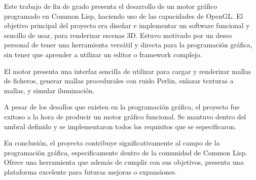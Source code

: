 Este trabajo de fin de grado presenta el desarrollo de un motor gráfico programado en Common Lisp,
haciendo uso de las capacidades de OpenGL.
El objetivo principal del proyecto era diseñar e implementar un software funcional y sencillo de usar,
para renderizar escenas 3D.
Estuvo motivado por un deseo personal de tener una herramienta versátil y directa para la programación gráfica,
sin tener que aprender a utilizar un editor o framework complejo.

El motor presenta una interfaz sencilla de utilizar para cargar y renderizar mallas de ficheros,
generar mallas procedurales con ruido Perlin,
enlazar texturas a mallas,
y simular iluminación.

A pesar de los desafíos que existen en la programación gráfica,
el proyecto fue exitoso a la hora de producir un motor gráfico funcional.
Se mantuvo dentro del umbral definido y se implementaron todos los requisitos que se especificaron.

En conclusión,
el proyecto contribuye significativamente al campo de la programación gráfica,
especificamente dentro de la comunidad de Common Lisp.
Ofrece una herramienta que además de cumplir con sus objetivos,
presenta una plataforma excelente para futuras mejoras o expansiones.

